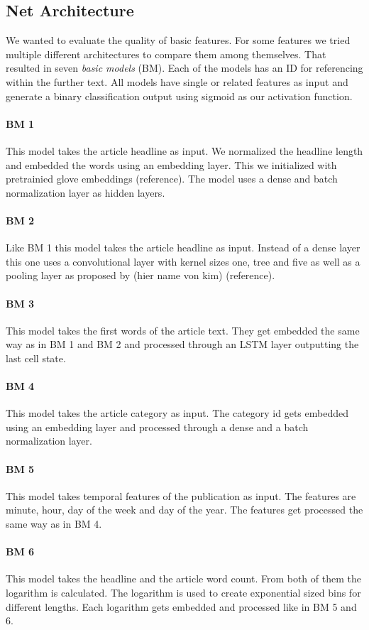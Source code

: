 \subsection{Net Architecture}

We wanted to evaluate the quality of basic features. For some features we tried multiple different architectures to compare them among themselves. That resulted in seven \textit{basic models} (BM). Each of the models has an ID for referencing within the further text.
All models have single or related features as input and generate a binary classification output using sigmoid as our activation function.

\paragraph{BM 1} This model takes the article headline as input. We normalized the headline length and embedded the words using an embedding layer. This we initialized with pretrainied glove embeddings (reference). The model uses a dense and batch normalization layer as hidden layers.
\paragraph{BM 2} Like BM 1 this model takes the article headline as input. Instead of a dense layer this one uses a convolutional layer with kernel sizes one, tree and five as well as a pooling layer as proposed by (hier name von kim) (reference).
\paragraph{BM 3} This model takes the first words of the article text. They get embedded the same way as in BM 1 and BM 2 and processed through an LSTM layer outputting the last cell state.
\paragraph{BM 4} This model takes the article category as input. The category id gets embedded using an embedding layer and processed through a dense and a batch normalization layer.
\paragraph{BM 5} This model takes temporal features of the publication as input. The features are minute, hour, day of the week and day of the year. The features get processed the same way as in BM 4.
\paragraph{BM 6} This model takes the headline and the article word count. From both of them the logarithm is calculated. The logarithm is used to create exponential sized bins for different lengths. Each logarithm gets embedded and processed like in BM 5 and 6.
